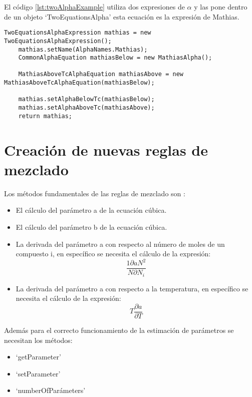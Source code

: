 	El código \ref{lst:twoAlphaExample} utiliza dos expresiones de $\alpha$ y las pone dentro de un objeto `TwoEquationsAlpha' esta ecuación es la expresión de Mathias.

\begin{lstlisting}[caption={Creación de una expresión de $\alpha$ con cambio de ecuación según la temperatura del sistema},label={lst:twoAlphaExample}]
	TwoEquationsAlphaExpression mathias = new TwoEquationsAlphaExpression();    
	mathias.setName(AlphaNames.Mathias);
	CommonAlphaEquation mathiasBelow = new MathiasAlpha();
    
	MathiasAboveTcAlphaEquation mathiasAbove = new MathiasAboveTcAlphaEquation(mathiasBelow);
    
	mathias.setAlphaBelowTc(mathiasBelow);
	mathias.setAlphaAboveTc(mathiasAbove);
	return mathias;     
\end{lstlisting}

\section{Creación de nuevas reglas de mezclado}\label{sec:newMixingRules}
	
	Los métodos fundamentales de las reglas de mezclado son :

	\begin{itemize}
		\item El cálculo del parámetro a de la ecuación cúbica.
		\item El cálculo del parámetro b de la ecuación cúbica.
		\item La derivada del parámetro a con respecto al número de moles de un compuesto i, en específico se necesita el cálculo de la expresión: 
		\begin{equation}
			\frac{1\partial a N^2}{N \partial N_i}
		\end{equation}
		\item La derivada del parámetro a con respecto a la temperatura, en específico se necesita el cálculo de la expresión: 
		\begin{equation}
			T \frac{\partial a}{\partial T}
		\end{equation}
	\end{itemize}

	Además para el correcto funcionamiento de la estimación de parámetros se necesitan los métodos: 
	\begin{itemize}
		\item `getParameter'
		\item `setParameter'
		\item `numberOfParámeters'
	\end{itemize}

